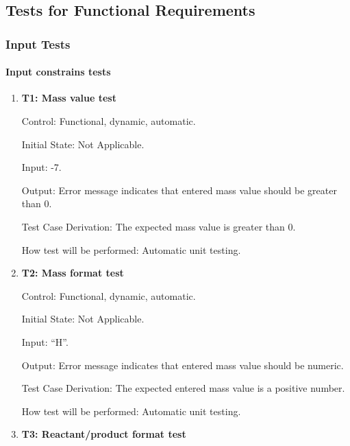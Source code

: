 \documentclass[12pt, titlepage]{article}
\begin{document}
\subsection{Tests for Functional Requirements}

\subsubsection{Input Tests}

\paragraph{Input constrains tests}

\begin{enumerate}

\item{\bf T1: Mass value test\\}

Control: Functional, dynamic, automatic.
					
Initial State: Not Applicable.
					
Input: -7. 
					
Output: Error message indicates that entered mass value should be greater than
0.

Test Case Derivation: The expected mass value is greater than 0.
					
How test will be performed: Automatic unit testing.

\item{\bf T2: Mass format test\\}

Control: Functional, dynamic, automatic.
					
Initial State: Not Applicable.
					
Input: ``H''.
					
Output: Error message indicates that entered mass value should be numeric.

Test Case Derivation: The expected entered mass value is a positive number.
					
How test will be performed: Automatic unit testing.

\item{\bf T3: Reactant/product format test\\}


\end{enumerate}
\end{document}
